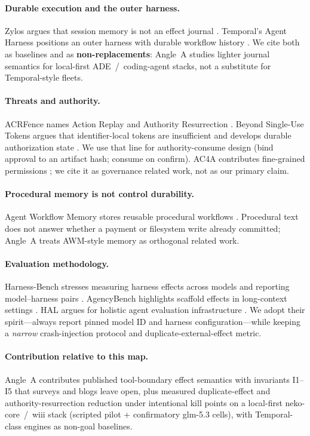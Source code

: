 \documentclass[11pt,a4paper]{article}
\begin{document}
\paragraph{Durable execution and the outer harness.}
Zylos argues that session memory is not an effect journal
\cite{zylos2026durable}. Temporal's Agent Harness positions an outer
harness with durable workflow history \cite{temporal2026agentharness}. We
cite both as baselines and as \textbf{non-replacements}: Angle~A studies
lighter journal semantics for local-first ADE~/~coding-agent stacks, not a
substitute for Temporal-style fleets.

\paragraph{Threats and authority.}
ACRFence names Action Replay and Authority Resurrection
\cite{acrfence2026}. Beyond Single-Use Tokens argues that identifier-local
tokens are insufficient and develops durable authorization state
\cite{beyondtokens2026}. We use that line for authority-consume design
(bind approval to an artifact hash; consume on confirm). AC4A contributes
fine-grained permissions \cite{ac4a2026}; we cite it as governance related
work, not as our primary claim.

\paragraph{Procedural memory is not control durability.}
Agent Workflow Memory stores reusable procedural workflows
\cite{awm2025}. Procedural text does not answer whether a payment or
filesystem write already committed; Angle~A treats AWM-style memory as
orthogonal related work.

\paragraph{Evaluation methodology.}
Harness-Bench stresses measuring harness effects across models and reporting
model--harness pairs \cite{harnessbench2026}. AgencyBench highlights
scaffold effects in long-context settings \cite{agencybench2026}. HAL argues
for holistic agent evaluation infrastructure \cite{hal2025}. We adopt their
spirit---always report pinned model ID and harness configuration---while
keeping a \emph{narrow} crash-injection protocol and
duplicate-external-effect metric.

\paragraph{Contribution relative to this map.}
Angle~A contributes published tool-boundary effect semantics with invariants
I1--I5 that surveys and blogs leave open, plus measured duplicate-effect
and authority-resurrection reduction under intentional kill points on a
local-first neko-core~/~wiii stack (scripted pilot + confirmatory
glm-5.3 cells), with Temporal-class engines as non-goal baselines.
\end{document}
